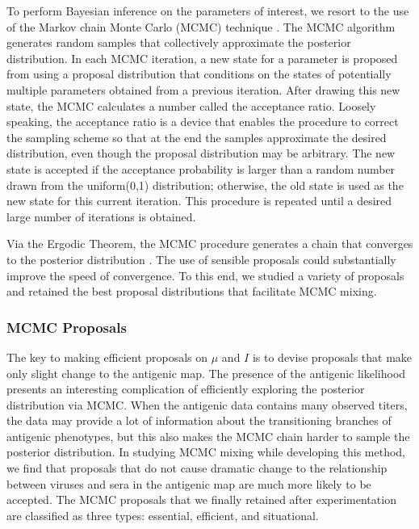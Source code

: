 \documentclass[11pt,oneside,letterpaper]{article}
\begin{document}
To perform Bayesian inference on the parameters of interest, we resort to the use of the Markov chain Monte Carlo (MCMC) technique \cite{hastings_monte_1970, metropolis_equation_1953}.
The MCMC algorithm generates random samples that collectively approximate the posterior distribution.
In each MCMC iteration, a new state for a parameter is proposed from using a proposal distribution that conditions on the states of potentially multiple parameters obtained from a previous iteration.
After drawing this new state, the MCMC calculates a number called the acceptance ratio.
Loosely speaking, the acceptance ratio is a device that enables the procedure to correct the sampling scheme so that at the end the samples approximate the desired distribution, even though the proposal distribution may be arbitrary.
The new state is accepted if the acceptance probability is larger than a random number drawn from the uniform(0,1) distribution; otherwise, the old state is used as the new state for this current iteration.
This procedure is repeated until a desired large number of iterations is obtained.


Via the Ergodic Theorem, the MCMC procedure generates a chain that converges to the posterior distribution \cite{hastings_monte_1970}. %
The use of sensible proposals could substantially improve the speed of convergence.
To this end, we studied a variety of proposals and retained the best proposal distributions that facilitate MCMC mixing.


\subsubsection*{MCMC Proposals}

The key to making efficient proposals on $\mu$ and $I$ is to devise proposals that make only slight change to the antigenic map.
The presence of the antigenic likelihood presents an interesting complication of efficiently exploring the posterior distribution via MCMC.
When the antigenic data contains many observed titers, the data may provide a lot of information about the transitioning branches of antigenic phenotypes, but this also makes the MCMC chain harder to sample the posterior distribution.
In studying MCMC mixing while developing this method, we find that proposals that do not cause dramatic change to the relationship between viruses and sera in the antigenic map are much more likely to be accepted.
The MCMC proposals that we finally retained after experimentation are classified as three types: essential, efficient, and situational. 
\end{document}
